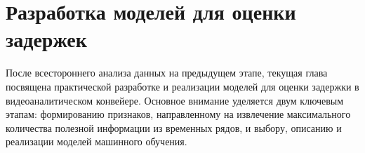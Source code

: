 \chapter{Разработка моделей для оценки задержек}
\label{ch:modeling}

\hspace*{1.25cm}После всестороннего анализа данных на предыдущем этапе, текущая глава посвящена практической разработке и реализации моделей для оценки задержки в видеоаналитическом конвейере. Основное внимание уделяется двум ключевым этапам: формированию признаков, направленному на извлечение максимального количества полезной информации из временных рядов, и выбору, описанию и реализации моделей машинного обучения.


